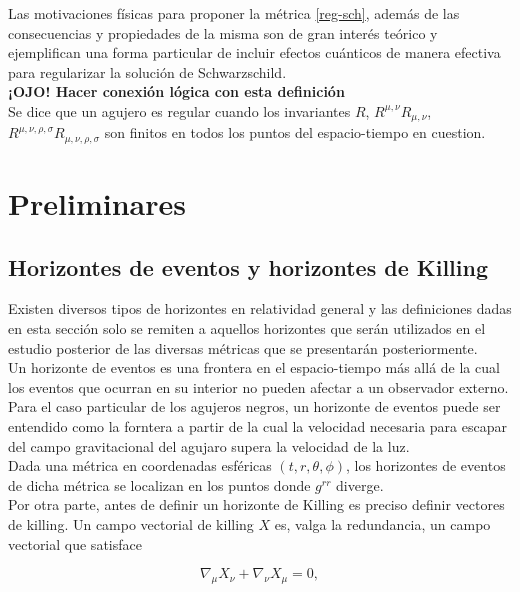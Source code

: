 \documentclass{article}
\numberwithin{equation}{section}
\begin{document}
Las motivaciones físicas para proponer la métrica \eqref{reg-sch}, además de las consecuencias y propiedades de la misma son de gran interés teórico y ejemplifican una forma particular de incluir efectos cuánticos de manera efectiva para regularizar la solución de Schwarzschild. \\

\textbf{¡OJO! Hacer conexión lógica con esta definición}\\

Se dice que un agujero es regular cuando los invariantes $R$, $R^{\mu,\nu}R_{\mu,\nu}$, $R^{\mu,\nu,\rho,\sigma}R_{\mu,\nu,\rho,\sigma}$ son finitos en todos los puntos del espacio-tiempo en cuestion.
 
\section{Preliminares}

\subsection{Horizontes de eventos y horizontes de Killing}

Existen diversos tipos de horizontes en relatividad general y las definiciones dadas en esta sección solo se remiten a aquellos horizontes que serán utilizados en el estudio posterior de las diversas métricas que se presentarán posteriormente.\\

Un horizonte de eventos es una frontera en el espacio-tiempo más allá de la cual los eventos que ocurran en su interior no pueden afectar a un observador externo. Para el caso particular de los agujeros negros, un horizonte de eventos puede ser entendido como la forntera a partir de la cual la velocidad necesaria para escapar del campo gravitacional del agujaro supera la velocidad de la luz.\\

Dada una métrica en coordenadas esféricas $(t,r,\theta,\phi)$, los horizontes de eventos de dicha métrica se localizan en los puntos donde $g^{rr}$ diverge.\\

Por otra parte, antes de definir un horizonte de Killing es preciso definir vectores de killing. Un campo vectorial de killing $X$ es, valga la redundancia, un campo vectorial que satisface

\begin{equation}
\nabla_\mu X_\nu + \nabla_\nu X_\mu = 0,
\end{equation}
\end{document}
